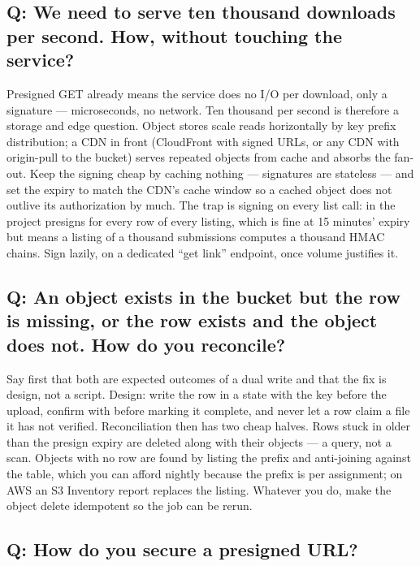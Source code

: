 \subsection*{Q: We need to serve ten thousand downloads per second. How, without touching the service?}

Presigned GET already means the service does no I/O per download, only
a signature --- microseconds, no network. Ten thousand per second is
therefore a storage and edge question. Object stores scale reads
horizontally by key prefix distribution; a CDN in front (CloudFront with
signed URLs, or any CDN with origin-pull to the bucket) serves repeated
objects from cache and absorbs the fan-out. Keep the signing cheap by
caching nothing --- signatures are stateless --- and set the expiry to
match the CDN's cache window so a cached object does not outlive its
authorization by much. The trap is signing on every list call:
 in the project presigns for every row of every
listing, which is fine at 15 minutes' expiry but means a listing of a
thousand submissions computes a thousand HMAC chains. Sign lazily, on a
dedicated ``get link'' endpoint, once volume justifies it.

\subsection*{Q: An object exists in the bucket but the row is missing, or the row exists and the object does not. How do you reconcile?}

Say first that both are expected outcomes of a dual write and that the
fix is design, not a script. Design: write the row in a
 state with the key before the upload, confirm with
 before marking it complete, and never let a row claim a
file it has not verified. Reconciliation then has two cheap halves. Rows
stuck in  older than the presign expiry are deleted along
with their objects --- a query, not a scan. Objects with no row are found
by listing the prefix and anti-joining against the table, which you can
afford nightly because the prefix is per assignment; on AWS an S3
Inventory report replaces the listing. Whatever you do, make the object
delete idempotent so the job can be rerun.

\subsection*{Q: How do you secure a presigned URL?}

